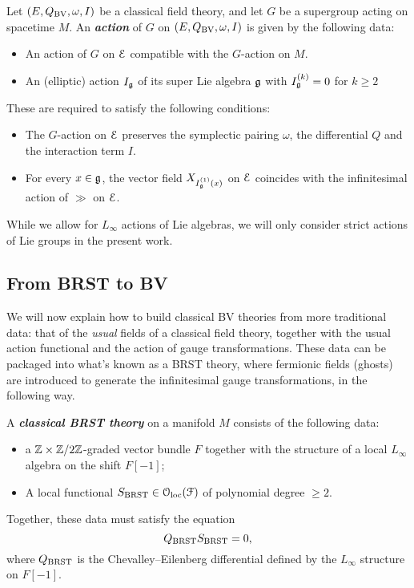 \documentclass[10pt, oneside]{article}
\newcommand{\defterm}[1]{\textbf{\emph{#1}}}
\begin{document}
\begin{definition}
\label{group_action_def}
Let $(E, Q_{\mathrm{BV}}, \omega, I)$ be a classical field theory, and let $G$ be a supergroup acting on spacetime $M$. An \defterm{action} of $G$ on $(E, Q_{\mathrm{BV}}, \omega, I)$ is given by the following data:
\begin{itemize}
\item An action of $G$ on $\mathcal E$ compatible with the $G$-action on $M$.

\item An (elliptic) action $I_\mathfrak g$ of its super Lie algebra $\mathfrak g$ with $I^{(k)}_\mathfrak g = 0$ for $k\geq 2$ 
\end{itemize}
These are required to satisfy the following conditions:
\begin{itemize}
\item The $G$-action on $\mathcal E$ preserves the symplectic pairing $\omega$, the differential $Q$ and the interaction term $I$.

\item For every $x\in\mathfrak g$, the vector field $X_{{I^{(1)}_\mathfrak g}(x)}$ on $\mathcal E$ coincides with the infinitesimal action of $\gg$ on $\mathcal E$.
\end{itemize}
\end{definition}

\begin{remark}
While we allow for $L_\infty$ actions of Lie algebras, we will only consider strict actions of Lie groups in the present work.
\end{remark}

\subsection{From BRST to BV}
We will now explain how to build classical BV theories from more traditional data: that of the \emph{usual} fields of a classical field theory, together with the usual action functional and the action of gauge transformations.  These data can be packaged into what's known as a BRST theory, where fermionic fields (ghosts) are introduced to generate the infinitesimal gauge transformations, in the following way.

\begin{definition}
A \defterm{classical BRST theory} on a manifold $M$ consists of the following data:
\begin{itemize}
\item a $\mathbb Z\times\mathbb Z/2\mathbb Z$-graded vector bundle $F$ together with the structure of a local $L_\infty$ algebra on the shift $F[-1]$;
\item A local functional $S_{\mathrm{BRST}} \in \mathcal{O}_{\rm loc}(\mathcal F)$ of polynomial degree $\geq 2$.
\end{itemize}
Together, these data must satisfy the equation
\[Q_{\mathrm{BRST}} S_{\mathrm{BRST}} = 0,\]
where $Q_{\mathrm{BRST}}$ is the Chevalley--Eilenberg differential defined by the $L_\infty$ structure on $F[-1]$. 
\end{definition}
\end{document}
